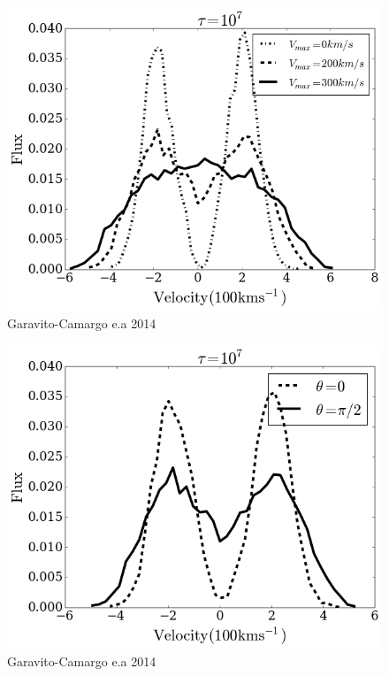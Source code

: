 \documentclass{beamer}
\begin{document}
\begin{frame}
\begin{figure}
\includegraphics[scale=0.4]{Figures/difvel.png}
\caption*{Garavito-Camargo e.a 2014}
\end{figure}
\end{frame}

\begin{frame}
\begin{figure}
\includegraphics[scale=0.4]{Figures/diftheta.png}
\caption*{Garavito-Camargo e.a 2014}
\end{figure}
\end{frame}
\end{document}
